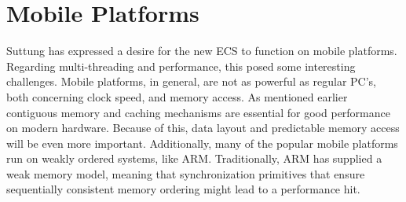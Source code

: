 \section{Mobile Platforms}
\label{sec:requirements_mobile_platforms}
Suttung has expressed a desire for the new ECS to function on mobile platforms.
Regarding multi-threading and performance, this posed some interesting challenges.
Mobile platforms, in general, are not as powerful as regular PC's, both concerning clock speed, and memory access.
As mentioned earlier contiguous memory and caching mechanisms are essential for good performance on modern hardware.
Because of this, data layout and predictable memory access will be even more important\cite[10:38]{andrei_alexandrescu_quick_code_quickly}.
Additionally, many of the popular mobile platforms run on weakly ordered systems, like ARM\cite{preshing_weak_vs_strong_memory_models}.
Traditionally, ARM has supplied a weak memory model, meaning that synchronization primitives that ensure sequentially consistent memory ordering might lead to a performance hit. 

